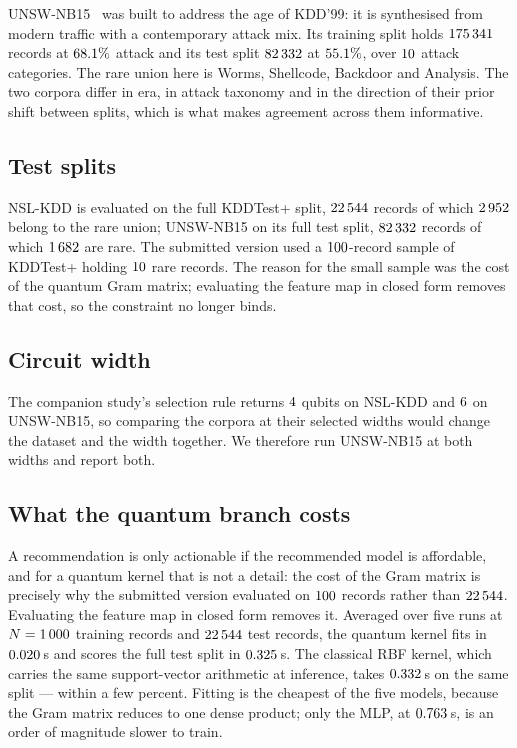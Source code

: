 \documentclass[journal]{IEEEtran}
\begin{document}
UNSW-NB15~\cite{moustafa2015unsw} was built to address the age of KDD'99: it
is synthesised from modern traffic with a contemporary attack mix. Its
training split holds $175\,341$ records at
$68.1\%$ attack and its test split $82\,332$ at
$55.1\%$, over $10$ attack categories. The rare
union here is Worms, Shellcode, Backdoor and Analysis. The two corpora
differ in era, in attack taxonomy and in the direction of their prior shift
between splits, which is what makes agreement across them informative.

\subsection{Test splits}
NSL-KDD is evaluated on the full KDDTest+ split, $22\,544$ records of which
$2\,952$ belong to the rare union; UNSW-NB15 on its full test split,
$82\,332$ records of which $1\,682$ are rare. The submitted version
used a $100$-record sample of KDDTest+ holding $10$ rare
records. The reason for the small sample was the cost of the quantum Gram
matrix; evaluating the feature map in closed form removes that cost, so the
constraint no longer binds.

\subsection{Circuit width}
The companion study's selection rule returns $4$ qubits on
NSL-KDD and $6$ on UNSW-NB15, so comparing the corpora at their
selected widths would change the dataset and the width together. We
therefore run UNSW-NB15 at both widths and report both.

\subsection{What the quantum branch costs}
A recommendation is only actionable if the recommended model is affordable,
and for a quantum kernel that is not a detail: the cost of the Gram matrix
is precisely why the submitted version evaluated on
$100$ records rather than $22\,544$. Evaluating the feature map in
closed form removes it. Averaged over five runs at $N=1\,000$ training
records and $22\,544$ test records, the quantum kernel fits in
$0.020$\,s and scores the full test split in $0.325$\,s.
The classical RBF kernel, which carries the same support-vector arithmetic
at inference, takes $0.332$\,s on the same split --- within a few
percent. Fitting is the cheapest of the five models, because the Gram
matrix reduces to one dense product; only the MLP, at $0.763$\,s, is
an order of magnitude slower to train.
\end{document}
